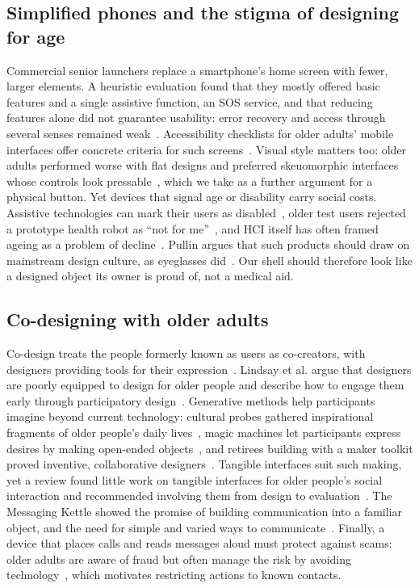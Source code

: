 \documentclass[acmtog,nonacm]{acmart}
\begin{document}
\subsection{Simplified phones and the stigma of designing for age}
Commercial senior launchers replace a smartphone's home screen with fewer, larger elements. A heuristic evaluation found that they mostly offered basic features and a single assistive function, an SOS service, and that reducing features alone did not guarantee usability: error recovery and access through several senses remained weak~\cite{petrovcic2018smart}. Accessibility checklists for older adults' mobile interfaces offer concrete criteria for such screens~\cite{diazbossini2014accessibility}. Visual style matters too: older adults performed worse with flat designs and preferred skeuomorphic interfaces whose controls look pressable~\cite{urbano2022skeuomorphism}, which we take as a further argument for a physical button. Yet devices that signal age or disability carry social costs. Assistive technologies can mark their users as disabled~\cite{shinohara2011shadow}, older test users rejected a prototype health robot as ``not for me''~\cite{neven2010obviously}, and HCI itself has often framed ageing as a problem of decline~\cite{vines2015age}. Pullin argues that such products should draw on mainstream design culture, as eyeglasses did~\cite{pullin2009design}. Our shell should therefore look like a designed object its owner is proud of, not a medical aid.

\subsection{Co-designing with older adults}
Co-design treats the people formerly known as users as co-creators, with designers providing tools for their expression~\cite{sanders2008cocreation}. Lindsay et al. argue that designers are poorly equipped to design for older people and describe how to engage them early through participatory design~\cite{lindsay2012engaging}. Generative methods help participants imagine beyond current technology: cultural probes gathered inspirational fragments of older people's daily lives~\cite{gaver1999cultural}, magic machines let participants express desires by making open-ended objects~\cite{andersen2019magic}, and retirees building with a maker toolkit proved inventive, collaborative designers~\cite{rogers2014never}. Tangible interfaces suit such making, yet a review found little work on tangible interfaces for older people's social interaction and recommended involving them from design to evaluation~\cite{bong2018tangible}. The Messaging Kettle showed the promise of building communication into a familiar object, and the need for simple and varied ways to communicate~\cite{brereton2015messaging}. Finally, a device that places calls and reads messages aloud must protect against scams: older adults are aware of fraud but often manage the risk by avoiding technology~\cite{frik2019privacy}, which motivates restricting actions to known contacts.
\end{document}
